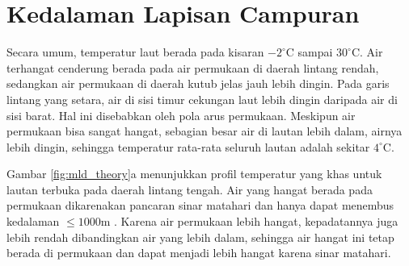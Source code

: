 \section[Kedalaman Lapisan Campuran]{Kedalaman Lapisan Campuran}
\begin{spacing}{1.5}
	Secara umum, temperatur laut berada pada kisaran $-2^\circ$C sampai $30^\circ$C. Air terhangat cenderung berada pada air permukaan di daerah lintang rendah, sedangkan air permukaan di daerah kutub jelas jauh lebih dingin. Pada garis lintang yang setara, air di sisi timur cekungan laut lebih dingin daripada air di sisi barat. Hal ini disebabkan oleh pola arus permukaan. Meskipun air permukaan bisa sangat hangat, sebagian besar air di lautan lebih dalam, airnya lebih dingin, sehingga temperatur rata-rata seluruh lautan adalah sekitar $4^\circ$C.
	
	Gambar \ref{fig:mld_theory}a menunjukkan profil temperatur yang khas untuk lautan terbuka pada daerah lintang tengah. Air yang hangat berada pada permukaan dikarenakan pancaran sinar matahari dan hanya dapat menembus kedalaman $\leq 1000$m . Karena air permukaan lebih hangat, kepadatannya juga lebih rendah dibandingkan air yang lebih dalam, sehingga air hangat ini tetap berada di permukaan dan dapat menjadi lebih hangat karena sinar matahari. 
	

\end{spacing}
